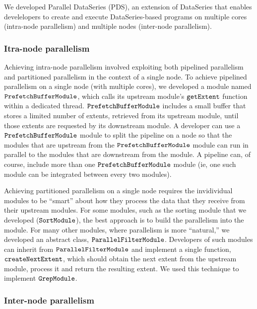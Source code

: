 \documentclass{acm_proc_article-sp}
\begin{document}
We developed Parallel DataSeries (PDS), an extension of DataSeries that enables
develelopers to create and execute DataSeries-based programs on multiple cores
(intra-node parallelism) and multiple nodes (inter-node parallelism).

\subsubsection{Itra-node parallelism}

Achieving intra-node parallelism involved exploiting both pipelined parallelism
and partitioned parallelism in the context of a single node. To achieve
pipelined parallelism on a single node (with multiple cores), we developed a
module named $\tt PrefetchBufferModule$, which calls its upstream module's $\tt
getExtent$ function within a dedicated thread. $\tt PrefetchBufferModule$
includes a small buffer that stores a limited number of extents, retrieved from its upstream module, until those extents are requested by its downstream
module. A developer can use a $\tt
PrefetchBufferModule$ module to split the pipeline on a node so that the
modules that are upstream from the $\tt
PrefetchBufferModule$ module can run in parallel to the modules that are
downstream from the module. A pipeline can, of course, include more than one
$\tt PrefetchBufferModule$ module (ie, one such module can be integrated
between every two modules).

Achieving partitioned parallelism on a single node requires the invidividual
modules to be ``smart'' about how they process the data that they receive from
their upstream modules. For some modules, such as the sorting module that we
developed ($\tt SortModule$), the best approach is to build the
parallelism into the module. For many other modules, where parallelism is more
``natural,'' we developed an abstract class, $\tt ParallelFilterModule$.
Developers of such modules can inherit from $\tt ParallelFilterModule$ and
implement a single function, $\tt createNextExtent$, which should obtain the
next extent from the upstream module, process it and return the resulting
extent. We used this technique to implement $\tt GrepModule$.

\subsubsection{Inter-node parallelism}
\end{document}
